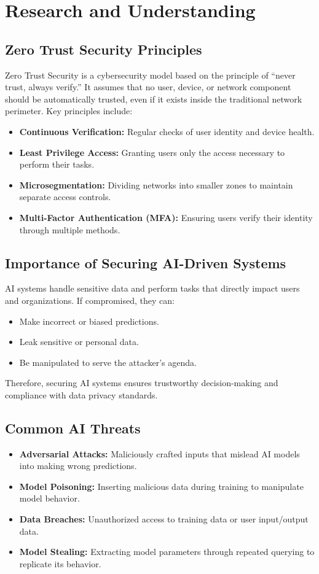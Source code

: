 \documentclass[a4paper,12pt]{article}
\begin{document}
\section{Research and Understanding}

\subsection{Zero Trust Security Principles}
Zero Trust Security is a cybersecurity model based on the principle of ``never trust, always verify.'' It assumes that no user, device, or network component should be automatically trusted, even if it exists inside the traditional network perimeter. Key principles include:
\begin{itemize}
    \item \textbf{Continuous Verification:} Regular checks of user identity and device health.
    \item \textbf{Least Privilege Access:} Granting users only the access necessary to perform their tasks.
    \item \textbf{Microsegmentation:} Dividing networks into smaller zones to maintain separate access controls.
    \item \textbf{Multi-Factor Authentication (MFA):} Ensuring users verify their identity through multiple methods.
\end{itemize}

\subsection{Importance of Securing AI-Driven Systems}
AI systems handle sensitive data and perform tasks that directly impact users and organizations. If compromised, they can:
\begin{itemize}
    \item Make incorrect or biased predictions.
    \item Leak sensitive or personal data.
    \item Be manipulated to serve the attacker’s agenda.
\end{itemize}
Therefore, securing AI systems ensures trustworthy decision-making and compliance with data privacy standards.

\subsection{Common AI Threats}
\begin{itemize}
    \item \textbf{Adversarial Attacks:} Maliciously crafted inputs that mislead AI models into making wrong predictions.
    \item \textbf{Model Poisoning:} Inserting malicious data during training to manipulate model behavior.
    \item \textbf{Data Breaches:} Unauthorized access to training data or user input/output data.
    \item \textbf{Model Stealing:} Extracting model parameters through repeated querying to replicate its behavior.
\end{itemize}
\end{document}
